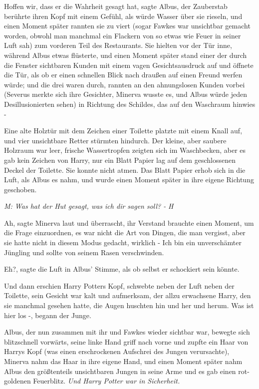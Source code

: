 \glqq{}Hoffen wir, dass er die Wahrheit gesagt hat\grqq{}, sagte Albus, der
Zauberstab berührte ihren Kopf mit einem Gefühl, als würde Wasser über sie
rieseln, und einen Moment später rannten sie zu viert (sogar Fawkes war
unsichtbar gemacht worden, obwohl man manchmal ein Flackern von so etwas wie
Feuer in seiner Luft sah) zum vorderen Teil des Restaurants. Sie hielten vor der
Tür inne, während Albus etwas flüsterte, und einen Moment später stand einer der
durch die Fenster sichtbaren Kunden mit einem vagen Gesichtsausdruck auf und
öffnete die Tür, als ob er einen schnellen Blick nach draußen auf einen Freund
werfen würde; und die drei waren durch, rannten an den ahnungslosen Kunden
vorbei (Severus merkte sich ihre Gesichter, Minerva wusste es, und Albus würde
jeden Desillusionierten sehen) in Richtung des Schildes, das auf den Waschraum
hinwies -

Eine alte Holztür mit dem Zeichen einer Toilette platzte mit einem Knall auf,
und vier unsichtbare Retter stürmten hindurch. Der kleine, aber saubere Holzraum
war leer, frische Wassertropfen zeigten sich im Waschbecken, aber es gab kein
Zeichen von Harry, nur ein Blatt Papier lag auf dem geschlossenen Deckel der
Toilette. Sie konnte nicht atmen. Das Blatt Papier erhob sich in die Luft, als
Albus es nahm, und wurde einen Moment später in ihre eigene Richtung geschoben.

\emph{M: Was hat der Hut gesagt, was
ich dir sagen soll? -}    \emph{H
}

\glqq{}Ah\grqq{}, sagte Minerva laut und überrascht, ihr Verstand brauchte einen
Moment, um die Frage einzuordnen, es war nicht die Art von Dingen, die man
vergisst, aber sie hatte nicht in diesem Modus gedacht, wirklich - \glqq{}Ich bin
ein unverschämter Jüngling und sollte von seinem Rasen verschwinden.\grqq{}

\glqq{}Eh?\grqq{}, sagte die Luft in Albus' Stimme, als ob selbst er schockiert
sein könnte.

Und dann erschien Harry Potters Kopf, schwebte neben der Luft neben der
Toilette, sein Gesicht war kalt und aufmerksam, der allzu erwachsene Harry, den
sie manchmal gesehen hatte, die Augen huschten hin und her und herum. \glqq{}Was
ist hier los -\grqq{}, begann der Junge.

Albus, der nun zusammen mit ihr und Fawkes wieder sichtbar war, bewegte sich
blitzschnell vorwärts, seine linke Hand griff nach vorne und zupfte ein Haar von
Harrys Kopf (was einen erschrockenen Aufschrei des Jungen verursachte), Minerva
nahm das Haar in ihre eigene Hand, und einen Moment später nahm Albus den
größtenteils unsichtbaren Jungen in seine Arme und es gab einen rot-goldenen
Feuerblitz. \emph{Und Harry Potter war in Sicherheit.}


